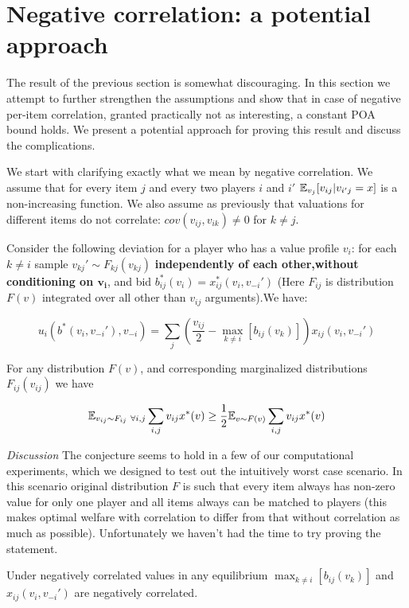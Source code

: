 \section{Negative correlation: a potential approach}
The result of the previous section is somewhat discouraging. In this section we attempt to further strengthen the assumptions and show that in case of negative per-item correlation, granted practically not as interesting, a constant POA bound holds. We present a potential approach for proving this result and discuss the complications.

We start with clarifying exactly what we mean by negative correlation. We assume that for every item $j$ and every two players $i$ and $i'$ ${\mathbb{E}}_{v_j}[v_{ij}|v_{i'j}=x]$ is a non-increasing function. We also assume as previously that valuations for different items do not correlate: $cov(v_{ij},v_{ik})\neq 0$ for $k\neq j$.

Consider the following deviation for a player who has a value profile $v_i$: for each $k\neq i$ sample $v_{kj}'\sim F_{kj}(v_{kj})$ \textbf{independently of each other,without conditioning on $\mathbf{v_i}$}, and bid $b_{ij}^*(v_i) = x^*_{ij}(v_i,v_{-i}')$ (Here $F_{ij}$ is distribution $F(v)$ integrated over all other than $v_{ij}$ arguments).We have:

$$u_i(b^*(v_i,v_{-i}'),v_{-i}) = \sum_j \left ( \frac{v_{ij}}{2}-\max_{k\neq i}[b_{ij}(v_k)]\right)x_{ij}(v_i,v_{-i}')$$


\begin{conjecture}
For any distribution $F(v)$, and corresponding marginalized distributions $F_{ij}(v_{ij})$ we have

$${\mathbb{E}}_{v_{ij}\sim F_{ij}\ \forall i,j} \sum_{i,j} v_{ij}x^*(v)\geq \frac{1}{2}{\mathbb{E}}_{v \sim F(v)}  \sum_{i,j} v_{ij}x^*(v)$$
\end{conjecture}
\textit{Discussion} The conjecture seems to hold in a few of our computational experiments, which we designed to test out the intuitively worst case scenario. In this scenario original distribution $F$ is such that every item always has non-zero value for only one player and all items always can be matched to players (this makes optimal welfare with correlation to differ from that without correlation as much as possible). Unfortunately we haven't had the time to try proving the statement.


\begin{conjecture}
Under negatively correlated values in any equilibrium $\max_{k\neq i}[b_{ij}(v_k)]$ and $x_{ij}(v_i,v_{-i}')$ are negatively correlated.
\end{conjecture}

